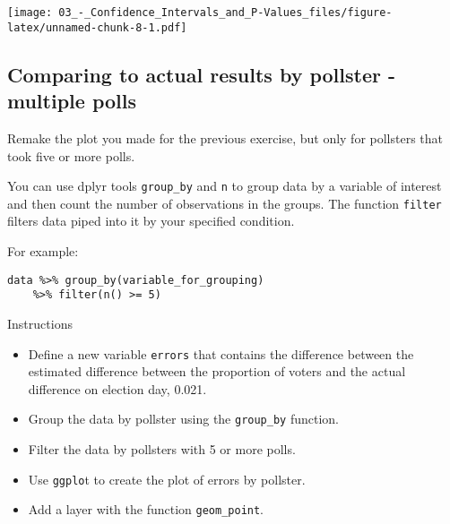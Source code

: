 \documentclass[]{article}
\newenvironment{Shaded}{\begin{snugshade}}{\end{snugshade}}
\newcommand{\KeywordTok}[1]{\textcolor[rgb]{0.13,0.29,0.53}{\textbf{#1}}}
\newcommand{\DataTypeTok}[1]{\textcolor[rgb]{0.13,0.29,0.53}{#1}}
\newcommand{\DecValTok}[1]{\textcolor[rgb]{0.00,0.00,0.81}{#1}}
\newcommand{\FloatTok}[1]{\textcolor[rgb]{0.00,0.00,0.81}{#1}}
\newcommand{\StringTok}[1]{\textcolor[rgb]{0.31,0.60,0.02}{#1}}
\newcommand{\CommentTok}[1]{\textcolor[rgb]{0.56,0.35,0.01}{\textit{#1}}}
\newcommand{\OperatorTok}[1]{\textcolor[rgb]{0.81,0.36,0.00}{\textbf{#1}}}
\newcommand{\NormalTok}[1]{#1}
\providecommand{\tightlist}{%
  \setlength{\itemsep}{0pt}\setlength{\parskip}{0pt}}
\begin{document}
\begin{Shaded}
\end{Shaded}

\texttt{[image: 03\_-\_Confidence\_Intervals\_and\_P-Values\_files/figure-latex/unnamed-chunk-8-1.pdf]}

\subsection{\texorpdfstring{\textbf{Comparing to actual results by
pollster - multiple
polls}}{Comparing to actual results by pollster - multiple polls}}\label{comparing-to-actual-results-by-pollster---multiple-polls}

Remake the plot you made for the previous exercise, but only for
pollsters that took five or more polls.

You can use dplyr tools \texttt{group\_by} and \texttt{n} to group data
by a variable of interest and then count the number of observations in
the groups. The function \texttt{filter} filters data piped into it by
your specified condition.

For example:

\begin{verbatim}
data %>% group_by(variable_for_grouping) 
    %>% filter(n() >= 5)
\end{verbatim}

Instructions

\begin{itemize}
\tightlist
\item
  Define a new variable \texttt{errors} that contains the difference
  between the estimated difference between the proportion of voters and
  the actual difference on election day, 0.021.
\item
  Group the data by pollster using the \texttt{group\_by} function.
\item
  Filter the data by pollsters with 5 or more polls.
\item
  Use \texttt{ggplo}t to create the plot of errors by pollster.
\item
  Add a layer with the function \texttt{geom\_point}.
\end{itemize}
\end{document}
